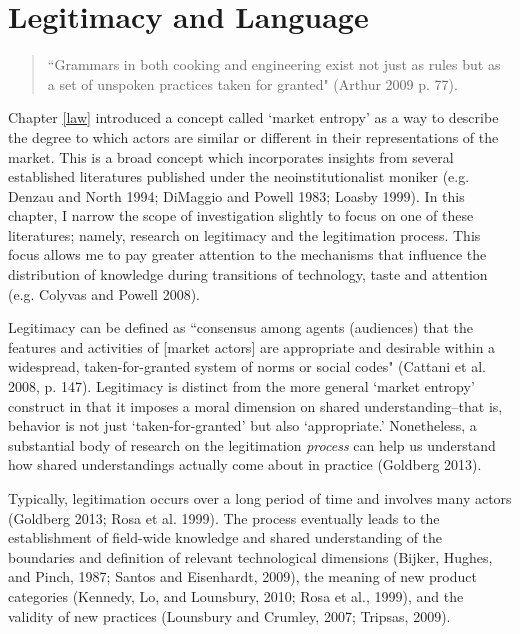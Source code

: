 \chapter{Legitimacy and Language\label{lang}}

\begin{small}
\begin{quote}
``Grammars in both cooking and engineering exist not just as rules but as a set of unspoken practices taken for granted" (Arthur 2009 p. 77).
\end{quote}
\end{small}
Chapter \ref{law} introduced a concept called `market entropy' as a way to describe the degree to which actors are similar or different in their representations of the market. This is a broad concept which incorporates insights from several established literatures published under the neoinstitutionalist moniker (e.g. Denzau and North 1994; DiMaggio and Powell 1983; Loasby 1999). In this chapter, I narrow the scope of investigation slightly to focus on one of these literatures; namely, research on legitimacy and the legitimation process. This focus allows me to pay greater attention to the mechanisms that influence the distribution of knowledge during transitions of technology, taste and attention (e.g. Colyvas and Powell 2008).

Legitimacy can be defined as ``consensus among agents (audiences) that the features and activities of [market actors] are appropriate and desirable within a widespread, taken-for-granted system of norms or social codes" (Cattani et al. 2008, p. 147). Legitimacy is distinct from the more general `market entropy' construct in that it imposes a moral dimension on shared understanding--that is, behavior is not just `taken-for-granted' but also `appropriate.' Nonetheless, a substantial body of research on the legitimation \emph{process} can help us understand how shared understandings actually come about in practice (Goldberg 2013).

Typically, legitimation occurs over a long period of time and involves many actors (Goldberg 2013; Rosa et al. 1999). The process eventually leads to the establishment of field-wide knowledge and shared understanding of the boundaries and definition of relevant technological dimensions (Bijker, Hughes, and Pinch, 1987; Santos and Eisenhardt, 2009), the meaning of new product categories (Kennedy, Lo, and Lounsbury, 2010; Rosa et al., 1999), and the validity of new practices (Lounsbury and Crumley, 2007; Tripsas, 2009). 

